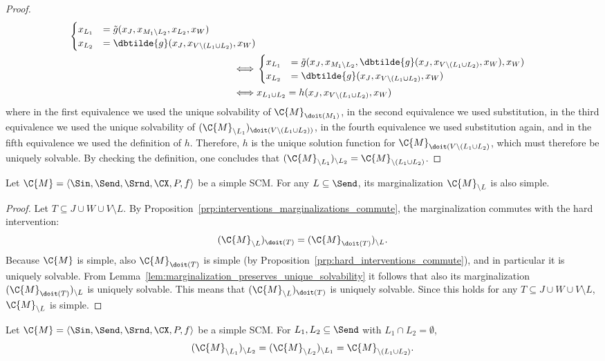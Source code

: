 \begin{proof}
\begin{equation*}
\begin{split}
\begin{cases}
      x_{L_1} &= \tilde{g}(x_J,x_{M_1\setminus L_2},x_{L_2},x_W) \\
      x_{L_2} &= \dbtilde{g}(x_J,x_{V\setminus(L_1 \cup L_2)},x_W)
    \end{cases} \\
    \iff &
    \begin{cases}
      x_{L_1} &= \tilde{g}(x_J,x_{M_1\setminus L_2},\dbtilde{g}(x_J,x_{V\setminus(L_1 \cup L_2)},x_W),x_W) \\
      x_{L_2} &= \dbtilde{g}(x_J,x_{V\setminus(L_1 \cup L_2)},x_W)
    \end{cases} \\
    \iff &
      x_{L_1\cup L_2} = h(x_J,x_{V\setminus(L_1\cup L_2)},x_W) 
  \end{split}\end{equation*}
  where in the first equivalence we used the unique solvability of $\C{M}_{\doit(M_1)}$, in the second
  equivalence we used substitution, in the third equivalence we used the unique solvability of
  $(\C{M}_{\setminus L_1})_{\doit(V\setminus (L_1\cup L_2))}$, in the fourth equivalence we used
  substitution again, and in the fifth equivalence we used the definition of $h$.
  Therefore, $h$ is the unique solution function for $\C{M}_{\doit(V\setminus(L_1\cup L_2)}$, which must therefore
  be uniquely solvable. By checking the definition, one concludes that $(\C{M}_{\setminus L_1})_{\setminus L_2} = \C{M}_{\setminus(L_1 \cup L_2)}$.
\end{proof}
\begin{Prp}\label{prp:marginalization_preserves_simplicity}
  Let $\C{M} = \langle \Sin, \Send, \Srnd, \CX, P, f \rangle$ be a simple SCM. For any $L \subseteq \Send$, 
  its marginalization $\C{M}_{\setminus L}$ is also simple.
\end{Prp}
\begin{proof}
  Let $T \subseteq J \cup W \cup V \setminus L$. 
  By Proposition~\ref{prp:interventions_marginalizations_commute}, 
  the marginalization commutes with the hard intervention:
  $$(\C{M}_{\setminus L})_{\doit(T)} = (\C{M}_{\doit(T)})_{\setminus L}.$$
  Because $\C{M}$ is simple, also $\C{M}_{\doit(T)}$ is simple (by Proposition~\ref{prp:hard_interventions_commute}), 
  and in particular it is
  uniquely solvable. From Lemma~\ref{lem:marginalization_preserves_unique_solvability} it follows that also
  its marginalization $(\C{M}_{\doit(T)})_{\setminus L}$ is uniquely solvable. 
  This means that $(\C{M}_{\setminus L})_{\doit(T)}$ is uniquely solvable. Since this
  holds for any $T \subseteq J \cup W \cup V \setminus L$, $\C{M}_{\setminus L}$ is simple.
\end{proof}
\begin{Cor}
  Let $\C{M} = \langle \Sin, \Send, \Srnd, \CX, P, f \rangle$ be a simple SCM.
  For $L_1, L_2 \subseteq \Send$ with $L_1 \cap L_2 = \emptyset$,
    $$(\C{M}_{\setminus L_1})_{\setminus L_2} = (\C{M}_{\setminus L_2})_{\setminus L_1} = \C{M}_{\setminus (L_1 \cup L_2)}.$$
\end{Cor}

